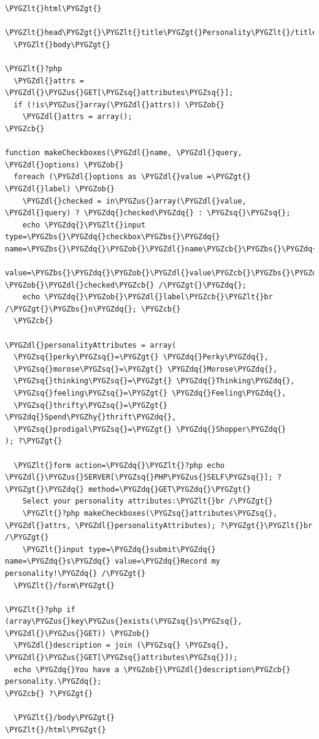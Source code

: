 \documentclass[a5paper,10pt,spanish]{sphinxmanual}
\def\PYGZbs{\char`\\}
\def\PYGZus{\char`\_}
\def\PYGZob{\char`\{}
\def\PYGZcb{\char`\}}
\def\PYGZlt{\char`\<}
\def\PYGZgt{\char`\>}
\def\PYGZdl{\char`\$}
\def\PYGZhy{\char`\-}
\def\PYGZsq{\char`\'}
\def\PYGZdq{\char`\"}
\begin{document}
\begin{Verbatim}[commandchars=\\\{\}]
\PYGZlt{}html\PYGZgt{}
  \PYGZlt{}head\PYGZgt{}\PYGZlt{}title\PYGZgt{}Personality\PYGZlt{}/title\PYGZgt{}\PYGZlt{}/head\PYGZgt{}
  \PYGZlt{}body\PYGZgt{}

\PYGZlt{}?php
  \PYGZdl{}attrs = \PYGZdl{}\PYGZus{}GET[\PYGZsq{}attributes\PYGZsq{}];
  if (!is\PYGZus{}array(\PYGZdl{}attrs)) \PYGZob{}
    \PYGZdl{}attrs = array();
\PYGZcb{}

function makeCheckboxes(\PYGZdl{}name, \PYGZdl{}query, \PYGZdl{}options) \PYGZob{}
  foreach (\PYGZdl{}options as \PYGZdl{}value =\PYGZgt{} \PYGZdl{}label) \PYGZob{}
    \PYGZdl{}checked = in\PYGZus{}array(\PYGZdl{}value, \PYGZdl{}query) ? \PYGZdq{}checked\PYGZdq{} : \PYGZsq{}\PYGZsq{};
    echo \PYGZdq{}\PYGZlt{}input type=\PYGZbs{}\PYGZdq{}checkbox\PYGZbs{}\PYGZdq{} name=\PYGZbs{}\PYGZdq{}\PYGZob{}\PYGZdl{}name\PYGZcb{}\PYGZbs{}\PYGZdq{}
          value=\PYGZbs{}\PYGZdq{}\PYGZob{}\PYGZdl{}value\PYGZcb{}\PYGZbs{}\PYGZdq{} \PYGZob{}\PYGZdl{}checked\PYGZcb{} /\PYGZgt{}\PYGZdq{};
    echo \PYGZdq{}\PYGZob{}\PYGZdl{}label\PYGZcb{}\PYGZlt{}br /\PYGZgt{}\PYGZbs{}n\PYGZdq{}; \PYGZcb{}
  \PYGZcb{}

\PYGZdl{}personalityAttributes = array(
  \PYGZsq{}perky\PYGZsq{}=\PYGZgt{} \PYGZdq{}Perky\PYGZdq{},
  \PYGZsq{}morose\PYGZsq{}=\PYGZgt{} \PYGZdq{}Morose\PYGZdq{},
  \PYGZsq{}thinking\PYGZsq{}=\PYGZgt{} \PYGZdq{}Thinking\PYGZdq{},
  \PYGZsq{}feeling\PYGZsq{}=\PYGZgt{} \PYGZdq{}Feeling\PYGZdq{},
  \PYGZsq{}thrifty\PYGZsq{}=\PYGZgt{} \PYGZdq{}Spend\PYGZhy{}thrift\PYGZdq{},
  \PYGZsq{}prodigal\PYGZsq{}=\PYGZgt{} \PYGZdq{}Shopper\PYGZdq{}
); ?\PYGZgt{}

  \PYGZlt{}form action=\PYGZdq{}\PYGZlt{}?php echo \PYGZdl{}\PYGZus{}SERVER[\PYGZsq{}PHP\PYGZus{}SELF\PYGZsq{}]; ?\PYGZgt{}\PYGZdq{} method=\PYGZdq{}GET\PYGZdq{}\PYGZgt{}
    Select your personality attributes:\PYGZlt{}br /\PYGZgt{}
    \PYGZlt{}?php makeCheckboxes(\PYGZsq{}attributes\PYGZsq{}, \PYGZdl{}attrs, \PYGZdl{}personalityAttributes); ?\PYGZgt{}\PYGZlt{}br /\PYGZgt{}
    \PYGZlt{}input type=\PYGZdq{}submit\PYGZdq{} name=\PYGZdq{}s\PYGZdq{} value=\PYGZdq{}Record my personality!\PYGZdq{} /\PYGZgt{}
  \PYGZlt{}/form\PYGZgt{}

\PYGZlt{}?php if (array\PYGZus{}key\PYGZus{}exists(\PYGZsq{}s\PYGZsq{}, \PYGZdl{}\PYGZus{}GET)) \PYGZob{}
  \PYGZdl{}description = join (\PYGZsq{} \PYGZsq{}, \PYGZdl{}\PYGZus{}GET[\PYGZsq{}attributes\PYGZsq{}]);
  echo \PYGZdq{}You have a \PYGZob{}\PYGZdl{}description\PYGZcb{} personality.\PYGZdq{};
\PYGZcb{} ?\PYGZgt{}

  \PYGZlt{}/body\PYGZgt{}
\PYGZlt{}/html\PYGZgt{}
\end{Verbatim}
\end{document}
